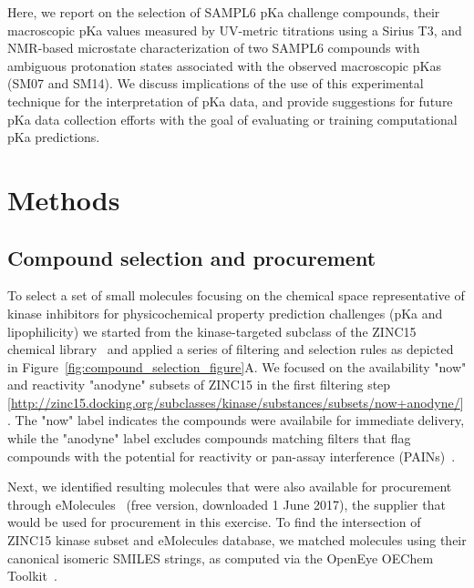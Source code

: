 \documentclass[9pt,lineno]{elife}
\begin{document}
Here, we report on the selection of SAMPL6 pKa challenge compounds, their macroscopic pKa values measured by UV-metric titrations using a Sirius T3, and NMR-based microstate characterization of two SAMPL6 compounds with ambiguous protonation states associated with the observed macroscopic pKas (SM07 and SM14). 
We discuss implications of the use of this experimental technique for the interpretation of pKa data, and provide suggestions for future pKa data collection efforts with the goal of evaluating or training computational pKa predictions.

\section{Methods}

\subsection{Compound selection and procurement}

To select a set of small molecules focusing on the chemical space representative of kinase inhibitors for physicochemical property prediction challenges (pKa and lipophilicity) we started from the kinase-targeted subclass of the ZINC15 chemical library~\citep{sterling_zinc_2015} and applied a series of filtering and selection rules as depicted in Figure~\ref{fig:compound_selection_figure}A. 
We focused on the availability "now" and reactivity "anodyne" subsets of ZINC15 in the first filtering step [\url{http://zinc15.docking.org/subclasses/kinase/substances/subsets/now+anodyne/}]. 
The "now" label indicates the compounds were availabile for immediate delivery, while the "anodyne" label excludes compounds matching filters that flag compounds with the potential for reactivity or pan-assay interference (PAINs)~\citep{baell_new_2010, saubern_knime_2011}. 

Next, we identified resulting molecules that were also available for procurement through eMolecules~\citep{eMolecules_ref_2017} (free version, downloaded 1 June 2017), the supplier that would be used for procurement in this exercise. 
To find the intersection of ZINC15 kinase subset and eMolecules database, we matched molecules using their canonical isomeric SMILES strings, as computed via the OpenEye OEChem Toolkit~\citep{oechem_openeye_2017}. 
\end{document}
